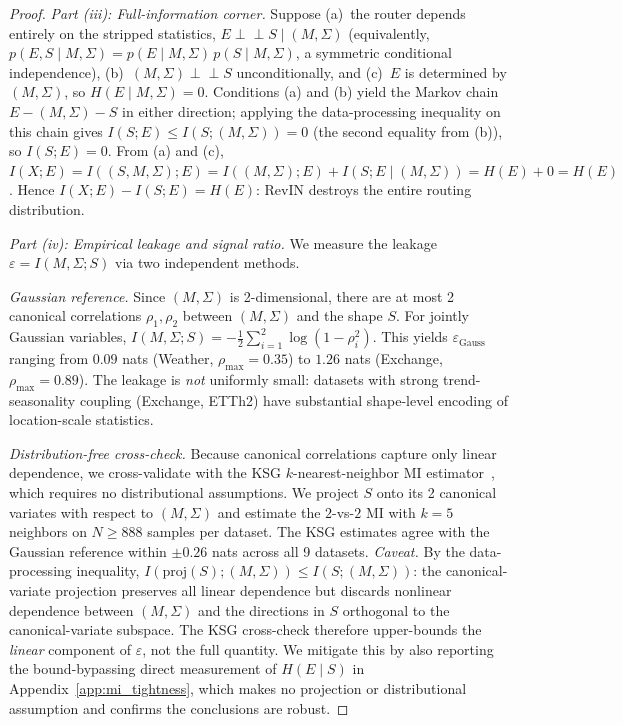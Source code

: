 \documentclass{article}
\begin{document}
\begin{proof}
\emph{Part (iii): Full-information corner.} Suppose (a)~the router depends entirely on the stripped statistics, $E \perp\!\!\!\perp S \mid (M, \Sigma)$ (equivalently, $p(E,S \mid M,\Sigma) = p(E\mid M,\Sigma)\,p(S\mid M,\Sigma)$, a symmetric conditional independence), (b)~$(M,\Sigma) \perp\!\!\!\perp S$ unconditionally, and (c)~$E$ is determined by $(M,\Sigma)$, so $H(E \mid M,\Sigma) = 0$. Conditions (a) and (b) yield the Markov chain $E \!-\! (M,\Sigma) \!-\! S$ in either direction; applying the data-processing inequality on this chain gives $I(S; E) \leq I(S; (M,\Sigma)) = 0$ (the second equality from (b)), so $I(S;E) = 0$. From (a) and (c), $I(X;E) = I((S,M,\Sigma); E) = I((M,\Sigma);E) + I(S;E\mid (M,\Sigma)) = H(E) + 0 = H(E)$. Hence $I(X;E) - I(S;E) = H(E)$: RevIN destroys the entire routing distribution.

\emph{Part (iv): Empirical leakage and signal ratio.} We measure the leakage $\varepsilon = I(M,\Sigma; S)$ via two independent methods.

\emph{Gaussian reference.} Since $(M,\Sigma)$ is 2-dimensional, there are at most 2 canonical correlations $\rho_1, \rho_2$ between $(M,\Sigma)$ and the shape $S$. For jointly Gaussian variables, $I(M,\Sigma; S) = -\frac{1}{2}\sum_{i=1}^2 \log(1 - \rho_i^2)$. This yields $\varepsilon_\text{Gauss}$ ranging from $0.09$ nats (Weather, $\rho_\text{max}{=}0.35$) to $1.26$ nats (Exchange, $\rho_\text{max}{=}0.89$). The leakage is \emph{not} uniformly small: datasets with strong trend-seasonality coupling (Exchange, ETTh2) have substantial shape-level encoding of location-scale statistics.

\emph{Distribution-free cross-check.} Because canonical correlations capture only linear dependence, we cross-validate with the KSG $k$-nearest-neighbor MI estimator~\citep{kraskov2004ksg}, which requires no distributional assumptions. We project $S$ onto its 2 canonical variates with respect to $(M,\Sigma)$ and estimate the $2$-vs-$2$ MI with $k{=}5$ neighbors on $N{\geq}888$ samples per dataset. The KSG estimates agree with the Gaussian reference within $\pm 0.26$ nats across all 9 datasets. \emph{Caveat.} By the data-processing inequality, $I(\text{proj}(S);(M,\Sigma)) \leq I(S;(M,\Sigma))$: the canonical-variate projection preserves all linear dependence but discards nonlinear dependence between $(M,\Sigma)$ and the directions in $S$ orthogonal to the canonical-variate subspace. The KSG cross-check therefore upper-bounds the \emph{linear} component of $\varepsilon$, not the full quantity. We mitigate this by also reporting the bound-bypassing direct measurement of $H(E\mid S)$ in Appendix~\ref{app:mi_tightness}, which makes no projection or distributional assumption and confirms the conclusions are robust.


\end{proof}
\end{document}
